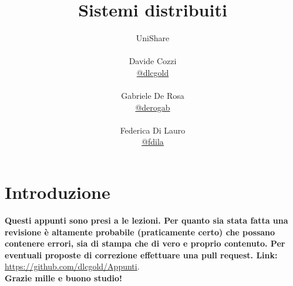 \documentclass[a4paper,12pt, oneside]{book}
\title{Sistemi distribuiti}
\author{UniShare\\\\Davide Cozzi\\\href{https://t.me/dlcgold}{@dlcgold}\\\\Gabriele De Rosa\\\href{https://t.me/derogab}{@derogab} \\\\Federica Di Lauro\\\href{https://t.me/f_dila}{@f\textunderscore dila}}
\date{}
\begin{document}
\maketitle


\newtheorem{teorema}{Teorema}
\newtheorem{definizione}{Definizione}
\newtheorem{esempio}{Esempio}
\newtheorem{corollario}{Corollario}
\newtheorem{lemma}{Lemma}
\newtheorem{osservazione}{Osservazione}
\newtheorem{nota}{Nota}
\newtheorem{esercizio}{Esercizio}
\tableofcontents
\renewcommand{\chaptermark}[1]{%
	\markboth{\chaptername
		\ \thechapter.\ #1}{}}
\renewcommand{\sectionmark}[1]{\markright{\thesection.\ #1}}
\chapter{Introduzione}
\textbf{Questi appunti sono presi a le lezioni. Per quanto sia stata fatta una revisione è altamente probabile (praticamente certo) che possano contenere errori, sia di stampa che di vero e proprio contenuto. Per eventuali proposte di correzione effettuare una pull request. Link: } \url{https://github.com/dlcgold/Appunti}.\\
\textbf{Grazie mille e buono studio!}
\end{document}
